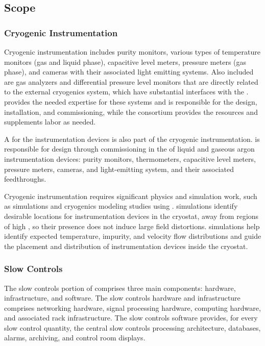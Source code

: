 \subsection{Scope}
\subsubsection{Cryogenic Instrumentation}
Cryogenic instrumentation includes purity monitors, various types of temperature monitors (gas and liquid phase), capacitive level meters, pressure meters (gas phase), and cameras with their associated light emitting systems. Also included are %
gas analyzers and differential pressure level monitors that are directly related to the external cryogenics system, which have substantial interfaces with the .  provides the needed expertise for these systems and is responsible for the design, installation, and commissioning, while the  consortium provides the resources and supplements labor as needed. 

A  for the instrumentation devices is also part of the cryogenic instrumentation.
  is responsible for design through commissioning in the  %
of liquid and gaseous argon instrumentation devices: purity monitors, thermometers, capacitive level meters, pressure meters, cameras, and light-emitting system, and their associated feedthroughs.

Cryogenic instrumentation %
requires significant physics and
simulation work, such as \efield simulations and cryogenics modeling
studies using . \efield simulations
identify desirable locations for instrumentation
devices in the cryostat, away from %
regions of high \efield, so %
their presence does not induce large field distortions. 
 simulations help identify %
expected temperature, impurity, and velocity flow distributions and guide the placement and distribution of instrumentation devices inside the cryostat.

\subsubsection{Slow Controls}
\label{sec:dp-cisc-slowctrl}
The slow controls portion of  comprises three main components: 
hardware, infrastructure, and software. The slow controls hardware and infrastructure comprises networking hardware, signal processing hardware, computing hardware, and associated rack infrastructure. The slow controls software provides, for every slow control quantity, the central slow controls processing architecture, databases, alarms, archiving, and control room displays.


